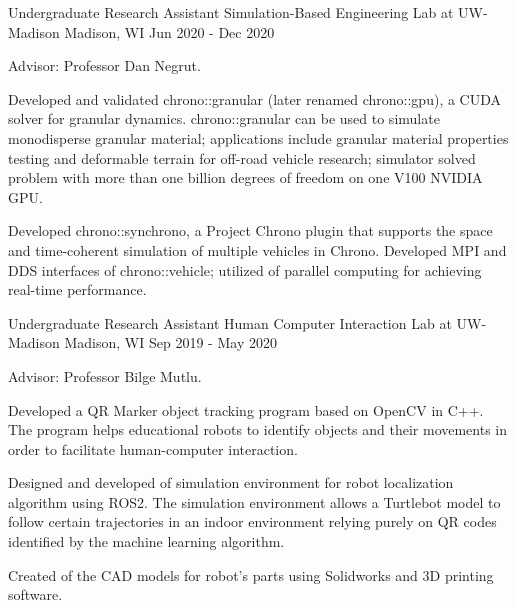 \begin{cventries}
		
	

  \cventry
	{Undergraduate Research Assistant} %
	{Simulation-Based Engineering Lab at UW-Madison} %
	{Madison, WI} %
	{Jun 2020 - Dec 2020} %
	{
		\begin{cvitems} %
			\item {Advisor: Professor Dan Negrut.}
			\item {Developed and validated chrono::granular (later renamed chrono::gpu), a CUDA solver for granular dynamics. chrono::granular can be used to simulate monodisperse granular material; applications include granular material properties testing and deformable terrain for off-road vehicle research; simulator solved problem with more than one billion degrees of freedom on one V100 NVIDIA GPU.}
			\item {Developed chrono::synchrono, a Project Chrono plugin that supports the space and time-coherent simulation of multiple vehicles in Chrono. Developed MPI and DDS interfaces of chrono::vehicle; utilized of parallel computing for achieving real-time performance.}
		\end{cvitems}
	}



  \cventry
	{Undergraduate Research Assistant} %
	{Human Computer Interaction Lab at UW-Madison} %
	{Madison, WI} %
	{Sep 2019 - May 2020} %
	{
	  \begin{cvitems} %
		\item {Advisor: Professor Bilge Mutlu.}
		\item {Developed a QR Marker object tracking program based on OpenCV in C++. The program helps educational robots to identify objects and their movements in order to facilitate human-computer interaction.}
		\item {Designed and developed of simulation environment for robot localization algorithm using ROS2. The simulation environment allows a Turtlebot model to follow certain trajectories in an indoor environment relying purely on QR codes identified by the machine learning algorithm.}
		\item {Created of the CAD models for robot's parts  using Solidworks and 3D printing software.}
	  \end{cvitems}
}



\end{cventries}
